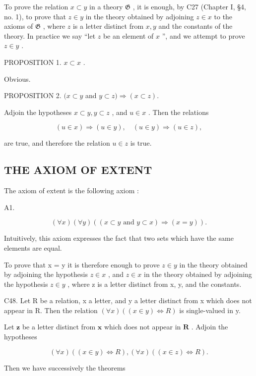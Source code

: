 To prove the relation \(x \subset y\) in a theory \(\mathfrak{G}\) , it is enough, by C27 (Chapter I, §4, no. 1), to prove that \(z \in y\) in the theory obtained by adjoining \(z \in x\) to the axioms of \(\mathfrak{G}\) , where \(z\) is a letter distinct from \(x, y\) and the constants of the theory. In practice we say ``let \(z\) be an element of \(x\) '', and we attempt to prove \(z \in y\) .

PROPOSITION 1. \(x \subset x\) .

Obvious.

PROPOSITION 2. \((x\subset y\) and \(y\subset z)\Longrightarrow (x\subset z).\)

Adjoin the hypotheses \(x \subset y, y \subset z\) , and \(u \in x\) . Then the relations

\[
(u \in x) \Longrightarrow (u \in y), \quad (u \in y) \Longrightarrow (u \in z),
\]

are true, and therefore the relation \(u \in z\) is true.

\subsection{THE AXIOM OF EXTENT}

The axiom of extent is the following axiom :

A1.

\[
(\forall x) (\forall y) ((x \subset y \text {   and   } y \subset x) \Longrightarrow (x = y)).
\]

Intuitively, this axiom expresses the fact that two sets which have the same elements are equal.

To prove that x = y it is therefore enough to prove \(z \in y\) in the theory obtained by adjoining the hypothesis \(z \in x\) , and \(z \in x\) in the theory obtained by adjoining the hypothesis \(z \in y\) , where z is a letter distinct from x, y, and the constants.

C48. Let R be a relation, x a letter, and y a letter distinct from x which does not appear in R. Then the relation \((\forall x)((x \in y) \Longleftrightarrow R)\) is single-valued in y.

Let \(\pmb{z}\) be a letter distinct from \(\pmb{x}\) which does not appear in \(\pmb{R}\) . Adjoin the hypotheses

\[
(\forall x) ((x \in y) \Longleftrightarrow R), (\forall x) ((x \in z) \Longleftrightarrow R).
\]

Then we have successively the theorems

